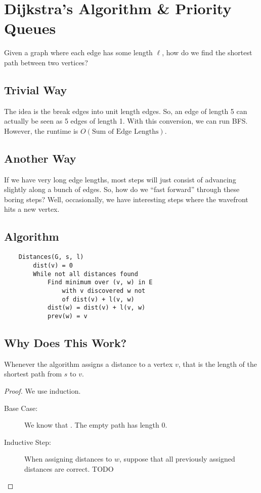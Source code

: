 \documentclass[letterpaper]{article}
\begin{document}
\section{Dijkstra's Algorithm \& Priority Queues}
Given a graph where each edge has some length $\ell$, how do we find the shortest path between two vertices? 

\subsection{Trivial Way}
The idea is the break edges into unit length edges. So, an edge of length 5 can actually be seen as 5 edges of length 1. With this conversion, we can run BFS. However, the runtime is $O(\text{Sum of Edge Lengths})$. 

\subsection{Another Way}
If we have very long edge lengths, most steps will just consist of advancing slightly along a bunch of edges. So, how do we ``fast forward'' through these boring steps? Well, occasionally, we have interesting steps where the wavefront hits a new vertex. 

\subsection{Algorithm}
\begin{verbatim}
    Distances(G, s, l)
        dist(v) = 0
        While not all distances found 
            Find minimum over (v, w) in E
                with v discovered w not 
                of dist(v) + l(v, w)
            dist(w) = dist(v) + l(v, w)
            prev(w) = v
\end{verbatim}

\subsection{Why Does This Work?}
\begin{proposition}
    Whenever the algorithm assigns a distance to a vertex $v$, that is the length of the shortest path from $s$ to $v$. 
\end{proposition}

\begin{mdframed}[]
    \begin{proof}
        We use induction.
        \begin{description}
            \item[Base Case:] We know that . The empty path has length 0. 
            \item[Inductive Step:] When assigning distances to $w$, suppose that all previously assigned distances are correct. TODO 
        \end{description}
    \end{proof}
\end{mdframed}
\end{document}
